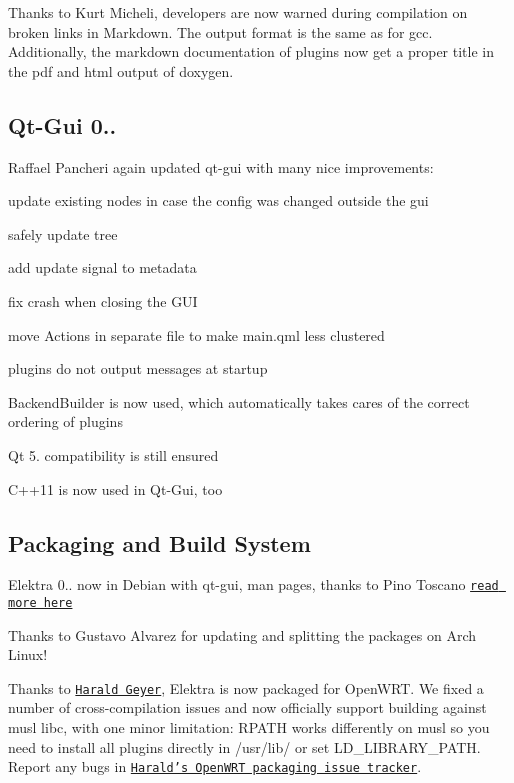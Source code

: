Thanks to Kurt Micheli, developers are now warned during compilation on broken links in Markdown. The output format is the same as for gcc. Additionally, the markdown documentation of plugins now get a proper title in the pdf and html output of doxygen.

\subsection*{Qt-\/\+Gui 0..}

Raffael Pancheri again updated qt-\/gui with many nice improvements\+:


\begin{DoxyItemize}
\item update existing nodes in case the config was changed outside the gui
\item safely update tree
\item add update signal to metadata
\item fix crash when closing the G\+U\+I
\item move Actions in separate file to make main.\+qml less clustered
\item plugins do not output messages at startup
\item {\ttfamily Backend\+Builder} is now used, which automatically takes cares of the correct ordering of plugins
\item Qt 5. compatibility is still ensured
\item C++11 is now used in Qt-\/\+Gui, too
\end{DoxyItemize}

\subsection*{Packaging and Build System}

Elektra 0.. now in Debian with qt-\/gui, man pages, thanks to Pino Toscano \href{https://packages.qa.debian.org/e/elektra/news/20151215T000031Z.html}{\tt read more here}

Thanks to Gustavo Alvarez for updating and splitting the packages on Arch Linux!

Thanks to \href{http://friends.ccbib.org/harald/supporting/}{\tt Harald Geyer}, Elektra is now packaged for Open\+W\+R\+T. We fixed a number of cross-\/compilation issues and now officially support building against musl libc, with one minor limitation\+: R\+P\+A\+T\+H works differently on musl so you need to install all plugins directly in /usr/lib/ or set L\+D\+\_\+\+L\+I\+B\+R\+A\+R\+Y\+\_\+\+P\+A\+T\+H. Report any bugs in \href{https://github.com/haraldg/packages}{\tt Harald's Open\+W\+R\+T packaging issue tracker}.


